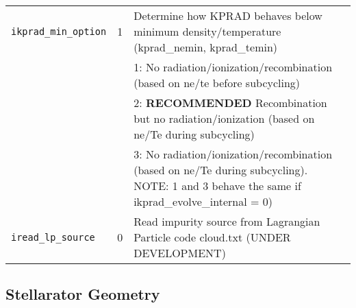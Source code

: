 \begin{tabular}{llp{4.5in}}
\texttt{ikprad\_min\_option}        & 1 & Determine how KPRAD behaves below minimum density/temperature
                                          (kprad\_nemin, kprad\_temin) \\ 
                                    &   & 1: No radiation/ionization/recombination (based on ne/te before subcycling) \\
                                    &   & 2: {\bf RECOMMENDED} Recombination but no radiation/ionization (based on ne/Te during subcycling) \\
                                    &   & 3: No radiation/ionization/recombination (based on ne/Te during subcycling).  
                                             NOTE: 1 and 3 behave the same if ikprad\_evolve\_internal = 0) \\

\texttt{iread\_lp\_source} & 0 & Read impurity source from Lagrangian Particle code cloud.txt (UNDER DEVELOPMENT)
\end{tabular}

\subsection{Stellarator Geometry}

